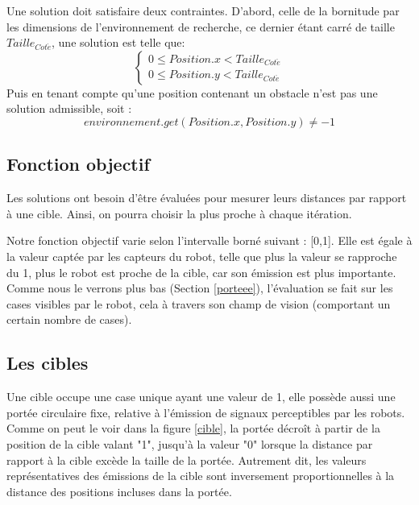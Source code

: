 Une solution doit satisfaire deux contraintes. D'abord, celle de la bornitude par les dimensions de l'environnement de recherche, ce dernier étant carré de taille $Taille_{Cot\acute{e}}$,
une solution est telle que:
\begin{equation}
\left\lbrace
\begin{array}{ccc}
0 \leq Position.x < Taille_{Cot\acute{e}}\\
0 \leq Position.y < Taille_{Cot\acute{e}}
\end{array}\right.
\end{equation}
Puis en tenant compte qu'une position contenant un obstacle n'est pas une solution admissible, soit :
\begin{equation}
environnement.get(Position.x , Position.y) \neq -1
\end{equation}



\subsection{Fonction objectif \label{fitness}}
Les solutions ont besoin d'être évaluées pour mesurer leurs distances par rapport à une cible. Ainsi, on pourra choisir la plus proche à chaque itération.

Notre fonction objectif varie selon l'intervalle borné suivant : [0,1]. Elle est égale à la valeur captée par les capteurs du robot, telle que plus la valeur se rapproche du 1, plus le robot est proche de la cible, car son émission est plus importante. Comme nous le verrons plus bas (Section \ref{porteee}), l'évaluation se fait sur les cases visibles par le robot, cela à travers son champ de vision (comportant un certain nombre de cases).

\subsection{Les cibles}
Une cible occupe une case unique ayant une valeur de 1, elle possède aussi une portée circulaire fixe, relative à l'émission de signaux perceptibles par les robots.\\ 

Comme on peut le voir dans la figure \ref{cible}, la portée décroît à partir de la position de la cible valant "1", jusqu'à la valeur "0" lorsque la distance par rapport à la cible excède la taille de la portée. Autrement dit, les valeurs représentatives des émissions de la cible sont inversement proportionnelles à la distance des positions incluses dans la portée.

